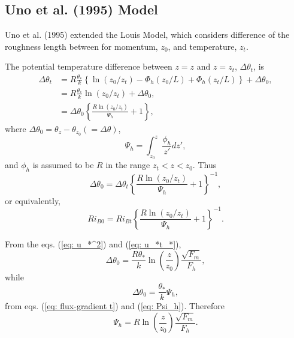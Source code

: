 \subsection{Uno et al. (1995) Model}
Uno et al. (1995) extended the Louis Model,
which considers difference of the roughness length
between for momentum, $z_0$, and temperature, $z_t$.

The potential temperature difference between $z=z$ and $z=z_t$,
$\Delta\theta_t$, is
\begin{align}
  \Delta\theta_t
  &= R\frac{\theta_*}{k}\left\{\ln(z_0/z_t) - \Phi_h(z_0/L) + \Phi_h(z_t/L)\right\} + \Delta\theta_0, \nonumber \\
  &= R\frac{\theta_*}{k}{\ln(z_0/z_t)} + \Delta\theta_0, \nonumber \\
  &= \Delta\theta_0 \left\{\frac{R\ln(z_0/z_t)}{\Psi_h} + 1\right\},
\end{align}
where $\Delta\theta_0 = \theta_z - \theta_{z_0} (=\Delta\theta)$,
\begin{equation}
  \Psi_h = \int_{z_0}^z\frac{\phi_h}{z'}dz', \label{eq: Psi_h}
\end{equation}
and $\phi_h$ is assumed to be $R$ in the range $z_t < z < z_0$.
Thus
\begin{equation}
  \Delta\theta_0 = \Delta\theta_t \left\{\frac{R\ln(z_0/z_t)}{\Psi_h}+1\right\}^{-1},
  \label{eq: Delta t_0}
\end{equation}
or equivalently,
\begin{equation}
  Ri_{B0} = Ri_{Bt} \left\{\frac{R\ln(z_0/z_t)}{\Psi_h}+1\right\}^{-1}.
  \label{eq: Ri_B0}
\end{equation}

From the eqs. (\ref{eq: u_*^2}) and (\ref{eq: u_*t_*}),
\begin{equation}
  \Delta\theta_0 = \frac{R\theta_*}{k}\ln\left(\frac{z}{z_0}\right)\frac{\sqrt{F_m}}{F_h},
\end{equation}
while
\begin{equation}
  \Delta\theta_0 = \frac{\theta_*}{k}\Psi_h,
\end{equation}
from eqs. (\ref{eq: flux-gradient t}) and (\ref{eq: Psi_h}).
Therefore
\begin{equation}
  \Psi_h = R\ln\left(\frac{z}{z_0}\right)\frac{\sqrt{F_m}}{F_h}.
\end{equation}

